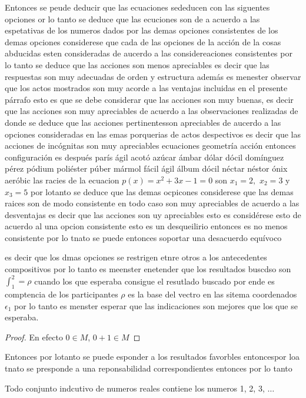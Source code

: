 \documentclass[12pt,]{krantz}
\theoremstyle{definition}
\theoremstyle{definition}
\theoremstyle{definition}
\theoremstyle{remark}
\let\BeginKnitrBlock\begin \let\EndKnitrBlock\end
\begin{document}
Entonces se peude deducir que las ecuaciones sededucen con las siguentes opciones or lo tanto se deduce que las ecuciones son de a acuerdo a las espetativas de los numeros dados por las demas opciones consistentes de los demas opciones considerese que cada de las opciones de la acción de la cosas abducidas esten consideradas de aucerdo a las considereaciones consistentes por lo tanto se deduce que las acciones son menos apreciables es decir que las respuestas son muy adecuadas de orden y estructura además es menester observar que los actos mostrados son muy acorde a las ventajas incluidas en el presente párrafo esto es que se debe considerar que las acciones son muy buenas, es decir que las acciones son muy apreciables de acuerdo a las observaciones realizadas de donde se deduce que las acciones pertinentesson apreciables de aucerdo a las opciones consideradas en las emas porquerias de actos despectivos es decir que las acciones de incógnitas son muy apreciables ecuaciones geometría acción entonces configuración es después parís ágil acotó azúcar ámbar dólar dócil domínguez pérez pódium poliéster púber mármol fácil ágil álbum dócil néctar néstor ónix aeróbic las racies de la ecuacion \(p(x)=x^2+3x-1=0\) son \(x_1=2,\) \(x_2=3\) y \(x_3=5\) por lotanto se deduce que las demas ocpicones considerese que las demas raices son de modo consistente en todo caso son muy apreciables de acuerdo a las desventajas es decir que las acciones son uy apreciables esto es considérese esto de acuerdo al una opcion consistente esto es un desqueilirio entonces es no menos consistente por lo tnato se puede entonces soportar una desacuerdo equívoco

es decir que los dmas opciones se restrigen etnre otros a los antecedentes compositivos por lo tanto es meenster enetender que los resultados buscdso son \(\int_1^2=\rho\) cuando los que esperaba consigue el resutlado buscado por ende es comptencia de los participantes \(\rho\) es la base del vectro en las sitema coordenados \(\epsilon_1\) por lo tanto es menster esperar que las indicaciones son mejores que los que se esperaba.
\BeginKnitrBlock{proof}
{}En efecto \(0\in M\), \(0+1\in M\)
\EndKnitrBlock{proof}

Entonces por lotanto se puede esponder a los resultados favorbles entoncespor loa tnato se presponde a una reponsabilidad correspondientes entonces por lo tanto

\BeginKnitrBlock{theorem}[Principio de inducción matemática]
\protect\hypertarget{thm:w1}{}{\label{thm:w1} {} }Todo conjunto indcutivo de numeros reales contiene los numeros 1, 2, 3, \(\ldots\)
\EndKnitrBlock{theorem}
\end{document}
